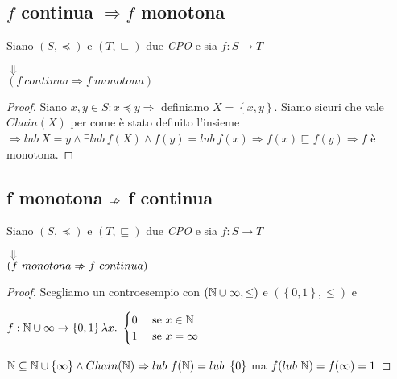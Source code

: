 \subsection{$f$  continua $\Rightarrow f$  monotona}
\begin{esercizio}
  Siano $(S, \preceq)$ e $(T, \sqsubseteq)$ due \emph{CPO} e sia $f: S \rightarrow T $
  \begin{center}
    $\Downarrow$\\
    $(f\ continua \Rightarrow f\ monotona)$
  \end{center}
  \begin{proof}
    Siano $x,y \in S : x \preceq y \Rightarrow $ definiamo $X = \left\{x,y\right\}$. Siamo sicuri che vale $Chain(X)$ per come è stato definito l'insieme $\Rightarrow lub\ X = y \land \exists lub\ f(X) \land f(y) = lub\ f(x) \Rightarrow f(x) \sqsubseteq f(y) \Rightarrow f$ è monotona.
  \end{proof}
\end{esercizio}


\subsection{f monotona $\Arrownot \Rightarrow$ f continua}
\begin{esercizio}
  Siano $(S, \preceq)$ e $(T, \sqsubseteq)$ due \emph{CPO} e sia $f: S \rightarrow T$
  \begin{center}
    $\Downarrow$\\
    $(f\ monotona \Arrownot \Rightarrow f\ continua)$
  \end{center}
  \begin{proof}
    Scegliamo un controesempio con $(\mathbb{N} \cup \infty, \leq)$ e $(\left\{0,1\right\},\leq)$ e
    \begin{center}
      $f: \mathbb{N} \cup \infty \rightarrow \left\{0,1\right\} \lambda x.$
      $\begin{cases}
        0 & \text{ se } x \in \mathbb{N}
        \\
        1 & \text{ se } x = \infty
      \end{cases}
      $
    \end{center}
    $\mathbb{N} \subseteq \mathbb{N} \cup \left\{\infty\right\} \land Chain(\mathbb{N}) \Rightarrow lub\ f(\mathbb{N}) = lub\ \left\{0\right\}$ ma $f(lub\ \Nset) = f(\infty) = 1$
  \end{proof}
\end{esercizio}

